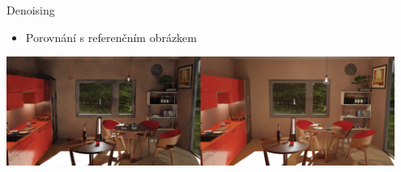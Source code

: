\documentclass[czech]{beamer}
\begin{document}
\begin{frame}{Denoising}
\begin{itemize}
  \item Porovnání s referenčním obrázkem
\end{itemize}
\vfill
\centering \includegraphics[width=0.95\textwidth]{img/denoise comparison.png}
\\
\end{frame}
\end{document}
